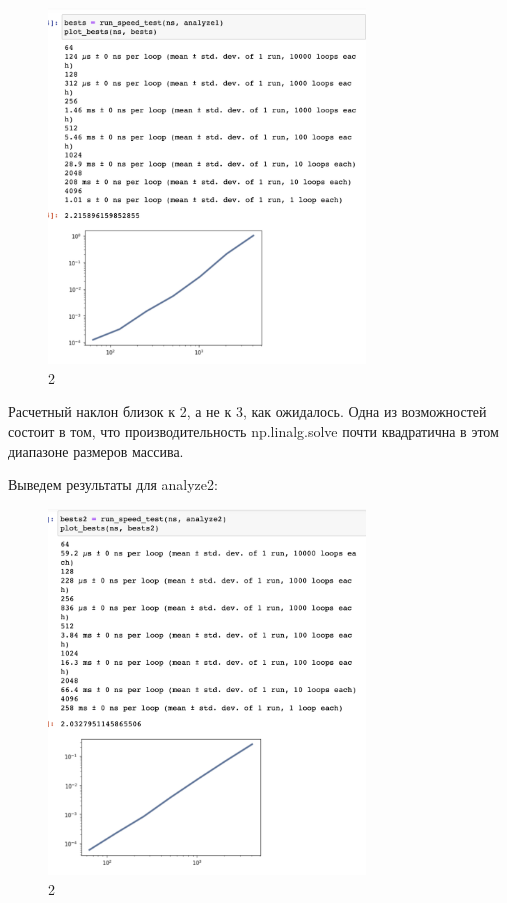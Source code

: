 \documentclass[10pt,a4paper,oneside]{article}
\begin{document}
\begin{figure}[H]
        \centering
        \includegraphics[width=0.75\textwidth]{pics/3.png}
        \caption{2}
        \label{fig:first}
\end{figure}

Расчетный наклон близок к 2, а не к 3, как ожидалось. Одна из возможностей состоит в том, что производительность np.linalg.solve почти квадратична в этом диапазоне размеров массива.

Выведем результаты для analyze2:

\begin{figure}[H]
        \centering
        \includegraphics[width=0.75\textwidth]{pics/4.png}
        \caption{2}
        \label{fig:first}
\end{figure}
\end{document}
